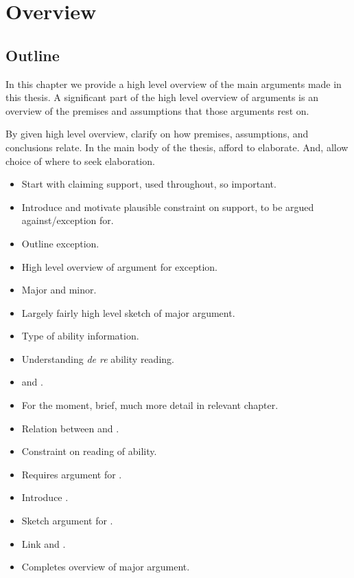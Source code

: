 \chapter{Overview}
\label{cha:overview}

\section{Outline}
\label{sec:outline}

\begin{note}
  In this chapter we provide a high level overview of the main arguments made in this thesis.
  A significant part of the high level overview of arguments is an overview of the premises and assumptions that those arguments rest on.

  By given high level overview, clarify on how premises, assumptions, and conclusions relate.
  In the main body of the thesis, afford to elaborate.
  And, allow choice of where to seek elaboration.
\end{note}

\begin{itemize}
\item Start with claiming support, used throughout, so important.
\item Introduce and motivate plausible constraint on support, to be argued against/exception for.
\item Outline exception.
\item High level overview of argument for exception.
\item Major and minor.
\item Largely fairly high level sketch of major argument.
\item Type of ability information.
\item Understanding \emph{de re} ability reading.
\item \AR{} and \WR{}.
\item For the moment, brief, much more detail in relevant chapter.
\item Relation between \AR{} and \ESU{}.
\item Constraint on reading of ability.
\item Requires argument for \WR{}.
\item Introduce \nI{}.
\item Sketch argument for \nI{}.
\item Link \nI{} and \AR{}.
\item Completes overview of major argument.
\end{itemize}

